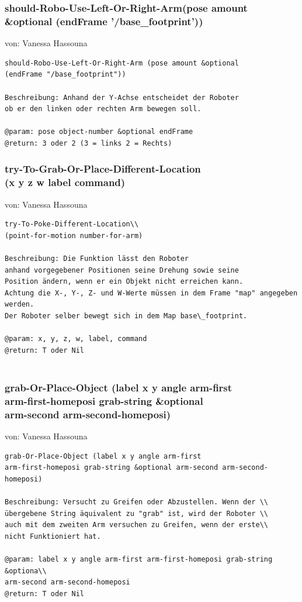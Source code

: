 \documentclass{suturo}
\makeatletter
\newcommand{\chapterauthor}[1]{%
  {\parindent0pt\vspace*{-27pt}%
  \linespread{0}\small\begin{flushright}von: #1\end{flushright}%
  \par\nobreak\vspace*{0pt}}
  \@afterheading%
}
\makeatother
\begin{document}
\subsubsection{should-Robo-Use-Left-Or-Right-Arm(pose amount \\
\&optional (endFrame '/base\_footprint'))}
\chapterauthor{Vanessa Hassouna}
\begin{verbatim}
should-Robo-Use-Left-Or-Right-Arm (pose amount &optional
(endFrame "/base_footprint"))

Beschreibung: Anhand der Y-Achse entscheidet der Roboter
ob er den linken oder rechten Arm bewegen soll.

@param: pose object-number &optional endFrame
@return: 3 oder 2 (3 = links 2 = Rechts)
\end{verbatim}

\subsubsection{ try-To-Grab-Or-Place-Different-Location\\
(x y z w label command)}
\chapterauthor{Vanessa Hassouna}
\begin{verbatim}
try-To-Poke-Different-Location\\
(point-for-motion number-for-arm)

Beschreibung: Die Funktion lässt den Roboter 
anhand vorgegebener Positionen seine Drehung sowie seine
Position ändern, wenn er ein Objekt nicht erreichen kann.
Achtung die X-, Y-, Z- und W-Werte müssen in dem Frame "map" angegeben werden.
Der Roboter selber bewegt sich in dem Map base\_footprint.

@param: x, y, z, w, label, command
@return: T oder Nil


\end{verbatim}

\subsubsection{  grab-Or-Place-Object (label x y angle arm-first \\
arm-first-homeposi grab-string \&optional \\
arm-second arm-second-homeposi)}
\chapterauthor{Vanessa Hassouna}
\begin{verbatim} 
grab-Or-Place-Object (label x y angle arm-first 
arm-first-homeposi grab-string &optional arm-second arm-second-homeposi)

Beschreibung: Versucht zu Greifen oder Abzustellen. Wenn der \\
übergebene String äquivalent zu "grab" ist, wird der Roboter \\
auch mit dem zweiten Arm versuchen zu Greifen, wenn der erste\\
nicht Funktioniert hat.

@param: label x y angle arm-first arm-first-homeposi grab-string &optiona\\
arm-second arm-second-homeposi
@return: T oder Nil
\end{verbatim}
\end{document}
